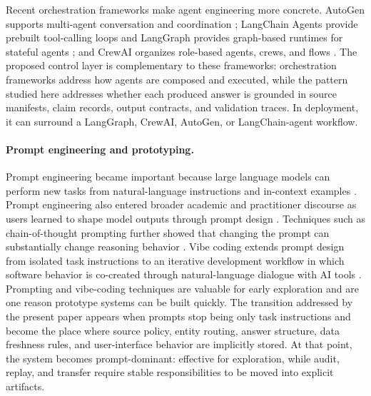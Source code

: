 Recent orchestration frameworks make agent engineering more concrete. AutoGen supports multi-agent conversation and coordination \citep{wu2024autogen}; LangChain Agents provide prebuilt tool-calling loops and LangGraph provides graph-based runtimes for stateful agents \citep{langchain2026agents,langchain2026langgraph}; and CrewAI organizes role-based agents, crews, and flows \citep{crewai2026software}. The proposed control layer is complementary to these frameworks: orchestration frameworks address how agents are composed and executed, while the pattern studied here addresses whether each produced answer is grounded in source manifests, claim records, output contracts, and validation traces. In deployment, it can surround a LangGraph, CrewAI, AutoGen, or LangChain-agent workflow.

\paragraph{Prompt engineering and prototyping.}
Prompt engineering became important because large language models can perform new tasks from natural-language instructions and in-context examples \citep{brown2020language,liu2023pretrain}. Prompt engineering also entered broader academic and practitioner discourse as users learned to shape model outputs through prompt design \citep{giray2023prompt}. Techniques such as chain-of-thought prompting further showed that changing the prompt can substantially change reasoning behavior \citep{wei2022chain}. Vibe coding extends prompt design from isolated task instructions to an iterative development workflow in which software behavior is co-created through natural-language dialogue with AI tools \citep{karpathy2025vibecoding,meske2025vibecoding,malamas2025vibecoding}. Prompting and vibe-coding techniques are valuable for early exploration and are one reason prototype systems can be built quickly. The transition addressed by the present paper appears when prompts stop being only task instructions and become the place where source policy, entity routing, answer structure, data freshness rules, and user-interface behavior are implicitly stored. At that point, the system becomes prompt-dominant: effective for exploration, while audit, replay, and transfer require stable responsibilities to be moved into explicit artifacts.

